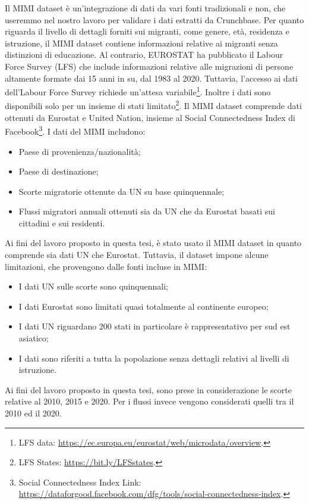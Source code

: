 Il MIMI dataset è un'integrazione di dati da vari fonti tradizionali e non, che useremmo nel nostro lavoro per validare i dati estratti da Crunchbase. 
Per quanto riguarda il livello di dettagli forniti sui migranti, come genere, età, residenza e istruzione, il MIMI dataset contiene informazioni relative ai migranti senza distinzioni di educazione. Al contrario, EUROSTAT ha pubblicato il Labour Force Survey (LFS) \cite{https://doi.org/10.2907/lfs1983-2020v.1} che include informazioni relative alle migrazioni di persone altamente formate dai 15 anni in su, dal 1983 al 2020. 
Tuttavia, l'accesso ai dati dell'Labour Force Survey richiede un'attesa variabile\footnote{LFS data: \url{https://ec.europa.eu/eurostat/web/microdata/overview}.}.
Inoltre i dati sono disponibili solo per un insieme di stati limitato\footnote{LFS States: \url{https://bit.ly/LFSstates}.}. 
Il MIMI dataset comprende dati ottenuti da Eurostat e United Nation, insieme al Social Connectedness Index di Facebook\footnote{Social Connectedness Index Link: \url{https://dataforgood.facebook.com/dfg/tools/social-connectedness-index}.}.
I dati del MIMI includono:
\begin{itemize}
    \item Paese di provenienza/nazionalità;
    \item Paese di destinazione;
    \item Scorte migratorie ottenute da UN su base quinquennale;
    \item Flussi migratori annuali ottenuti sia da UN che da Eurostat basati sui cittadini e sui residenti.
\end{itemize}
Ai fini del lavoro proposto in questa tesi, è stato usato il MIMI dataset in quanto comprende sia dati UN che Eurostat. Tuttavia, il dataset impone alcune limitazioni, che provengono dalle fonti incluse in MIMI: 
\begin{itemize}
    \item I dati UN sulle scorte sono quinquennali;
    \item I dati Eurostat sono limitati quasi totalmente al continente europeo;
    \item I dati UN riguardano 200 stati in particolare è rappresentativo per sud est asiatico;
    \item I dati sono riferiti a tutta la popolazione senza dettagli relativi al livelli di istruzione.
\end{itemize}
Ai fini del lavoro proposto in questa tesi, sono prese in considerazione le scorte relative al 2010, 2015 e 2020.  Per i flussi invece vengono considerati quelli tra il 2010 ed il 2020. 

